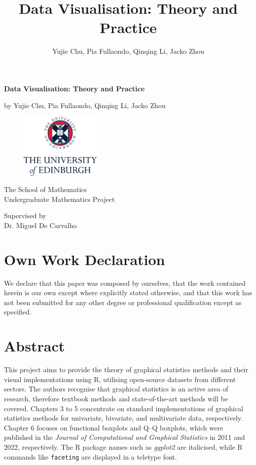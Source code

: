 \documentclass{article}\usepackage[]{graphicx}\usepackage[]{xcolor}
\title{Data Visualisation: Theory and Practice}
\author{Yujie Chu, Pia Fullaondo, Qinqing Li, Jacko Zhou}
\numberwithin{equation}{section}
\begin{document}
\begin{center}
\textbf{\huge Data Visualisation: Theory and Practice} \\
\vspace{0.5cm}

\LARGE by 
\vspace{0.25cm}
\LARGE Yujie Chu, Pia Fullaondo, Qinqing Li, Jacko Zhou \\
\vspace {1.5cm}

\begin{figure}[H]
    \centering
    \includegraphics[width=0.35\textwidth]{image_reference/UniversityLogo.png}
\end{figure}

\vspace {1.5cm}

The School of Mathematics \\
Undergraduate Mathematics Project
\vspace {0.25cm}

\vspace{1.5cm}

Supervised by \\
Dr. Miguel De Carvalho \\
\end{center}

\newpage

\section*{Own Work Declaration}

\noindent We declare that this paper was composed by ourselves, that the work contained herein is our own except where explicitly stated otherwise, and that this work has not been submitted for any other degree or professional qualification except as specified.

\newpage

\section*{Abstract}

\noindent
This project aims to provide the theory of graphical statistics methods and their visual implementations using R, utilising open-source datasets from different sectors. The authors recognise that graphical statistics is an active area of research, therefore textbook methods and state-of-the-art methods will be covered. Chapters 3 to 5 concentrate on standard implementations of graphical statistics methods for univariate, bivariate, and multivariate data, respectively. Chapter 6 focuses on functional boxplots and Q–Q boxplots, which were published in the \textit{Journal of Computational and Graphical Statistics} in 2011 and 2022, respectively. The R package names such as \textit{ggplot2} are italicised, while R commands like \texttt{faceting} are displayed in a teletype font.\\
\end{document}
